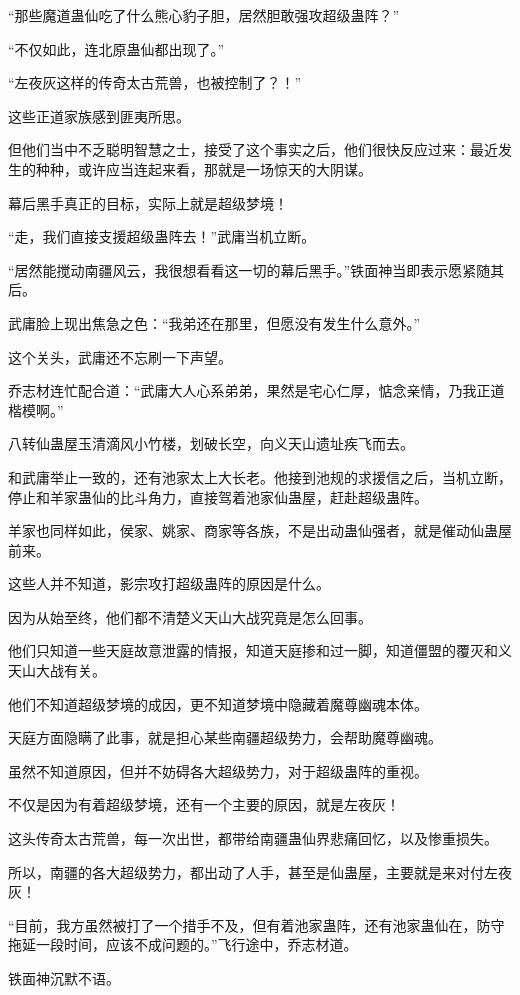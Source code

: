 \begin{this_body}
“那些魔道蛊仙吃了什么熊心豹子胆，居然胆敢强攻超级蛊阵？”

“不仅如此，连北原蛊仙都出现了。”

“左夜灰这样的传奇太古荒兽，也被控制了？！”

这些正道家族感到匪夷所思。

但他们当中不乏聪明智慧之士，接受了这个事实之后，他们很快反应过来：最近发生的种种，或许应当连起来看，那就是一场惊天的大阴谋。

幕后黑手真正的目标，实际上就是超级梦境！

“走，我们直接支援超级蛊阵去！”武庸当机立断。

“居然能搅动南疆风云，我很想看看这一切的幕后黑手。”铁面神当即表示愿紧随其后。

武庸脸上现出焦急之色：“我弟还在那里，但愿没有发生什么意外。”

这个关头，武庸还不忘刷一下声望。

乔志材连忙配合道：“武庸大人心系弟弟，果然是宅心仁厚，惦念亲情，乃我正道楷模啊。”

八转仙蛊屋玉清滴风小竹楼，划破长空，向义天山遗址疾飞而去。

和武庸举止一致的，还有池家太上大长老。他接到池规的求援信之后，当机立断，停止和羊家蛊仙的比斗角力，直接驾着池家仙蛊屋，赶赴超级蛊阵。

羊家也同样如此，侯家、姚家、商家等各族，不是出动蛊仙强者，就是催动仙蛊屋前来。

这些人并不知道，影宗攻打超级蛊阵的原因是什么。

因为从始至终，他们都不清楚义天山大战究竟是怎么回事。

他们只知道一些天庭故意泄露的情报，知道天庭掺和过一脚，知道僵盟的覆灭和义天山大战有关。

他们不知道超级梦境的成因，更不知道梦境中隐藏着魔尊幽魂本体。

天庭方面隐瞒了此事，就是担心某些南疆超级势力，会帮助魔尊幽魂。

虽然不知道原因，但并不妨碍各大超级势力，对于超级蛊阵的重视。

不仅是因为有着超级梦境，还有一个主要的原因，就是左夜灰！

这头传奇太古荒兽，每一次出世，都带给南疆蛊仙界悲痛回忆，以及惨重损失。

所以，南疆的各大超级势力，都出动了人手，甚至是仙蛊屋，主要就是来对付左夜灰！

“目前，我方虽然被打了一个措手不及，但有着池家蛊阵，还有池家蛊仙在，防守拖延一段时间，应该不成问题的。”飞行途中，乔志材道。

铁面神沉默不语。


\end{this_body}
